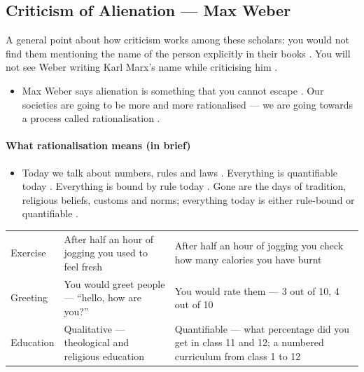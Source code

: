\subsection{Criticism of Alienation --- Max Weber}

\begin{CriticalPoint}
A general point about how criticism works among these scholars: you would not find them mentioning the name of the person explicitly in their books . You will not see Weber writing Karl Marx's name while criticising him .
\end{CriticalPoint}

\begin{itemize}
    \item Max Weber says alienation is something that you cannot escape . Our societies are going to be more and more rationalised --- we are going towards a process called rationalisation .
\end{itemize}

\paragraph{What rationalisation means (in brief)}
\begin{itemize}
    \item Today we talk about numbers, rules and laws . Everything is quantifiable today . Everything is bound by rule today . Gone are the days of tradition, religious beliefs, customs and norms; everything today is either rule-bound or quantifiable .
\end{itemize}

\begin{table}[h!]
\centering
\begin{tabularx}{\textwidth}{lYY}
\toprule
{}
\thead{} &  &  \\
\midrule
Exercise & After half an hour of jogging you used to feel fresh & After half an hour of jogging you check how many calories you have burnt \\
Greeting & You would greet people --- ``hello, how are you?'' & You would rate them --- 3 out of 10, 4 out of 10 \\
Education & Qualitative --- theological and religious education & Quantifiable --- what percentage did you get in class 11 and 12; a numbered curriculum from class 1 to 12 \\
\bottomrule
\end{tabularx}
\end{table}

